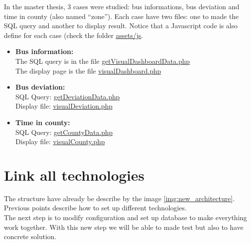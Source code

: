 \documentclass[a4paper,12pt]{article}
\begin{document}
        In the master thesis, 3 cases were studied: bus informations, bus deviation and time in county (also named ``zone''). Each case have two files: one to made the SQL query and another to display result. Notice that a Javascript code is also define for each case (check the folder \href{https://github.com/detobel36/MobilityDBComparison/tree/master/Website/assets/js}{assets/js}.
        \begin{itemize}
            \item \textbf{Bus information:}\\
                The SQL query is in the file \href{https://github.com/detobel36/MobilityDBComparison/blob/master/Website/controllers/getVisualDashboardData.php}{getVisualDashboardData.php}\\
                The display page is the file \href{https://github.com/detobel36/MobilityDBComparison/blob/master/Website/controllers/visualDashboard.php}{visualDashboard.php}
            \item \textbf{Bus deviation:}\\
                SQL Query: \href{https://github.com/detobel36/MobilityDBComparison/blob/master/Website/controllers/getDeviationData.php}{getDeviationData.php}\\
                Display file: \href{https://github.com/detobel36/MobilityDBComparison/blob/master/Website/controllers/visualDeviation.php}{visualDeviation.php}
            \item \textbf{Time in county:}\\
                SQL Query: \href{https://github.com/detobel36/MobilityDBComparison/blob/master/Website/controllers/getCountyData.php}{getCountyData.php}\\
                Display file: \href{https://github.com/detobel36/MobilityDBComparison/blob/master/Website/controllers/visualCounty.php}{visualCounty.php}
        \end{itemize}

        
         
\section{Link all technologies}
    \label{sec:link_technologies}
    The structure have already be describe by the image \ref{img:new_architecture}. Previous points describe how to set up different technologies.\\
    The next step is to modify configuration and set up database to make everything work together. With this new step we will be able to made test but also to have concrete solution.\\
    
\end{document}

